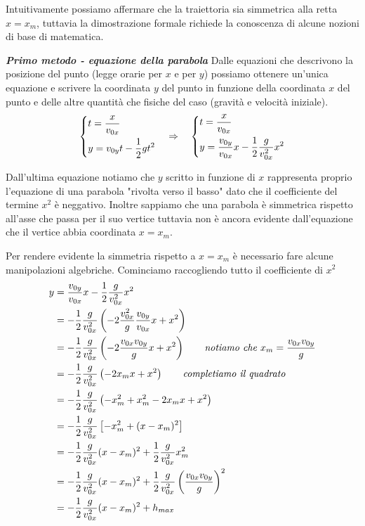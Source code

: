 \documentclass{article}
\begin{document}
Intuitivamente possiamo affermare che la traiettoria sia simmetrica alla retta $x=x_m$, tuttavia la dimostrazione formale richiede la conoscenza di alcune nozioni di base di matematica.

\textbf{\textit{Primo metodo - equazione della parabola}}
\newline
Dalle equazioni che descrivono la posizione del punto (legge orarie per $x$ e per $y$) possiamo ottenere un'unica equazione e scrivere la coordinata $y$ del punto in funzione della coordinata $x$ del punto e delle altre quantità che fisiche del caso (gravità e velocità iniziale).
\begin{equation}
  \begin{dcases}
    t = \frac{x}{v_{0x}}\\
    y = v_{0y} t - \frac{1}{2}gt^2
  \end{dcases}
  \quad\Rightarrow\quad
  \begin{dcases}
    t = \frac{x}{v_{0x}}\\
    y = \frac{v_{0y}}{v_{0x}} x - \frac{1}{2}\frac{g}{v_{0x}^2}x^2
  \end{dcases}
\end{equation}

Dall'ultima equazione notiamo che $y$ scritto in funzione di $x$ rappresenta proprio l'equazione di una parabola "rivolta verso il basso" dato che il coefficiente del termine $x^2$ è neggativo.
Inoltre sappiamo che una parabola è simmetrica rispetto all'asse che passa per il suo vertice tuttavia non è ancora evidente dall'equazione che il vertice abbia coordinata $x=x_m$.

Per rendere evidente la simmetria rispetto a $x=x_m$ è necessario fare alcune manipolazioni algebriche. Cominciamo raccogliendo tutto il coefficiente di $x^2$
\begin{align}
  y &= \frac{v_{0y}}{v_{0x}} x - \frac{1}{2}\frac{g}{v_{0x}^2}x^2 \\
    &= -\frac{1}{2}\frac{g}{v_{0x}^2} \left(-2\frac{v_{0x}^2}{g}\frac{v_{0y}}{v_{0x}}x + x^2\right) \\
    &= -\frac{1}{2}\frac{g}{v_{0x}^2} \left(-2\frac{v_{0x}v_{0y}}{g}x + x^2\right) \qquad\text{\textit{notiamo che $x_m=\frac{v_{0x}v_{0y}}{g}$}} \\
    &= -\frac{1}{2}\frac{g}{v_{0x}^2} \left(-2x_mx + x^2\right) \qquad \text{\textit{completiamo il quadrato}} \\
    &= -\frac{1}{2}\frac{g}{v_{0x}^2} \left(-x_m^2 + x_m^2 -2x_mx + x^2\right) \\
    &= -\frac{1}{2}\frac{g}{v_{0x}^2} \left[-x_m^2 + (x-x_m)^2\right] \\
    &= -\frac{1}{2}\frac{g}{v_{0x}^2} (x-x_m)^2 + \frac{1}{2}\frac{g}{v_{0x}^2}x_m^2 \\
    &= -\frac{1}{2}\frac{g}{v_{0x}^2} (x-x_m)^2 + \frac{1}{2}\frac{g}{v_{0x}^2}\left(\frac{v_{0x}v_{0y}}{g}\right)^2 \\
    &= -\frac{1}{2}\frac{g}{v_{0x}^2} (x-x_m)^2 + h_{max}
\end{align}
\end{document}
